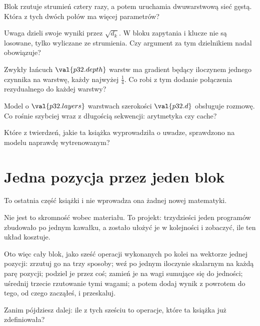 \begin{quiz}
\item Blok rzutuje strumień cztery razy, a potem uruchamia dwuwarstwową sieć
  gęstą. Która z tych dwóch połów ma więcej parametrów?
\item Uwaga dzieli swoje wyniki przez $\sqrt{d_k}$. W bloku zapytania i
  klucze nie są losowane, tylko wyliczane ze strumienia. Czy argument za tym
  dzielnikiem nadal obowiązuje? 
\item Zwykły łańcuch $\val{p32.depth}$ warstw ma gradient będący iloczynem
  jednego czynnika na warstwę, każdy najwyżej $\frac{1}{4}$. Co robi z tym
  dodanie połączenia rezydualnego do każdej warstwy? 
\item Model o $\val{p32.layers}$ warstwach szerokości $\val{p32.d}$ obsługuje
  rozmowę. Co rośnie szybciej wraz z długością sekwencji: arytmetyka czy
  cache? 
\item Które z twierdzeń, jakie ta książka wyprowadziła o uwadze, sprawdzono
  na modelu naprawdę wytrenowanym? 
\end{quiz}

\section{Jedna pozycja przez jeden blok}
\label{sec:P32-one-block}

\begin{fr}
To ostatnia część książki i nie wprowadza ona żadnej nowej matematyki.

Nie jest to skromność wobec materiału. To projekt: trzydzieści jeden
programów zbudowało po jednym kawałku, a zostało ułożyć je w kolejności i
zobaczyć, ile ten układ kosztuje.

Oto więc cały blok, jako sześć operacji wykonanych po kolei na wektorze
jednej pozycji: zrzutuj go na trzy sposoby; weź po jednym iloczynie skalarnym
na każdą parę pozycji; podziel je przez coś; zamień je na wagi sumujące się
do jedności; uśrednij trzecie rzutowanie tymi wagami; a potem dodaj wynik z
powrotem do tego, od czego zacząłeś, i przeskaluj.

Zanim pójdziesz dalej: ile z tych sześciu to operacje, które ta książka już
zdefiniowała?
\dotline
\nextframe
\end{fr}

